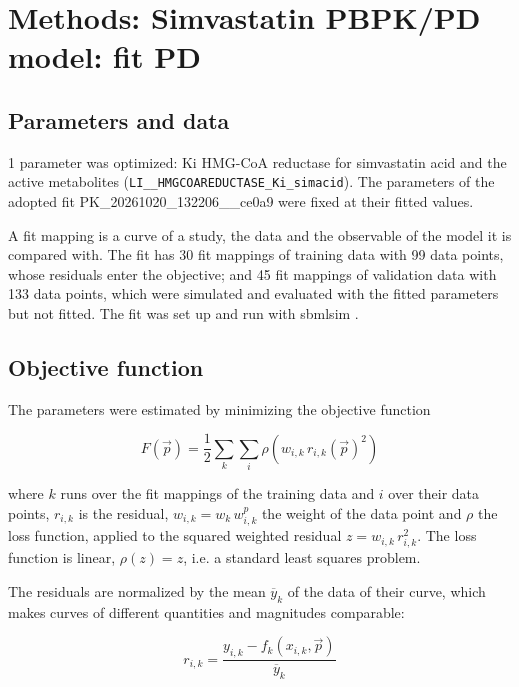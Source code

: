 \section{Methods: Simvastatin PBPK/PD model: fit PD}

\subsection{Parameters and data}

1 parameter was optimized: Ki HMG-CoA reductase for simvastatin acid and the active metabolites (\texttt{LI\_\_HMGCOAREDUCTASE\_Ki\_simacid}). The parameters of the adopted fit PK\_20261020\_132206\_\_ce0a9 were fixed at their fitted values.

A fit mapping is a curve of a study, the data and the observable of the model it is compared with. The fit has 30 fit mappings of training data with 99 data points, whose residuals enter the objective; and 45 fit mappings of validation data with 133 data points, which were simulated and evaluated with the fitted parameters but not fitted. The fit was set up and run with sbmlsim \cite{Koenig2026_sbmlsim}.

\subsection{Objective function}

The parameters were estimated by minimizing the objective function

\begin{equation}
F(\vec{p}) = \frac{1}{2} \sum_{k} \sum_{i} \rho\left(w_{i,k}\, r_{i,k}(\vec{p})^2\right)
\end{equation}

where $k$ runs over the fit mappings of the training data and $i$ over their data points, $r_{i,k}$ is the residual, $w_{i,k} = w_k\, w^{p}_{i,k}$ the weight of the data point and $\rho$ the loss function, applied to the squared weighted residual $z = w_{i,k}\, r_{i,k}^2$. The loss function is linear, $\rho(z) = z$, i.e. a standard least squares problem.

The residuals are normalized by the mean $\overline{y}_k$ of the data of their curve, which makes curves of different quantities and magnitudes comparable:

\begin{equation}
r_{i,k} = \frac{y_{i,k} - f_k(x_{i,k}, \vec{p})}{\overline{y}_k}
\end{equation}

